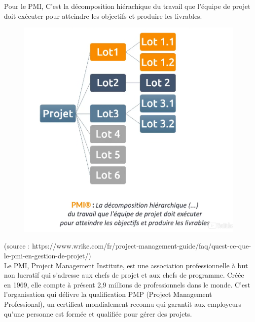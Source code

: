 Pour le PMI, C'est la décomposition hiérachique du travail que l'équipe de projet doit exécuter pour atteindre les objectifs et produire les livrables.
\begin{figure}[!h]
	\begin{center}
		\includegraphics[scale=0.2]{images/wbs.png}
	\end{center}
\end{figure}
\begin{know}
	(source : https://www.wrike.com/fr/project-management-guide/faq/quest-ce-que-le-pmi-en-gestion-de-projet/)\\
	Le PMI, Project Management Institute, est une association professionnelle à but non lucratif qui s'adresse aux chefs de projet et aux chefs de programme. Créée en 1969, elle compte à présent 2,9 millions de professionnels dans le monde. C'est l'organisation qui délivre la qualification PMP (Project Management Professional), un certificat mondialement reconnu qui garantit aux employeurs qu'une personne est formée et qualifiée pour gérer des projets. 
\end{know}
